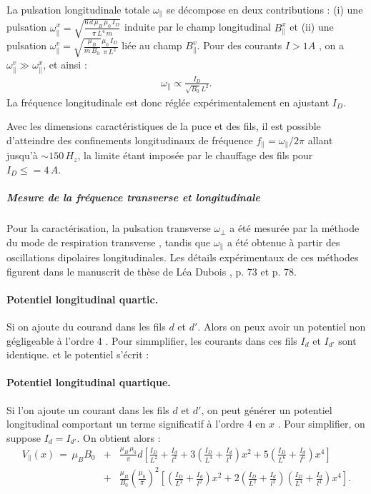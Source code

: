 \medskip

La pulsation longitudinale totale $\omega_\parallel$ se décompose en deux contributions : (i) une pulsation $\omega_\parallel^x = \sqrt{\frac{6\, d \, \mu_B \, \mu_0 \,I_D }{\pi \, L^4 \, m}}$ induite par le champ longitudinal $B_\parallel^x$ et (ii) une pulsation $\omega_\parallel^v = \sqrt{\frac{\mu_B }{m \, B_0}}\frac{\mu_0 \, I_D }{\pi \, L^2}$ liée au champ  $B_\parallel^v$. Pour des courants $I>1A$ , on a $\omega_\parallel^v \gg \omega_\parallel^x$, et ainsi :  
\begin{eqnarray*}
	\omega_\parallel \propto \frac{I_D}{\sqrt{B_0} L^2}.
\end{eqnarray*} 
La fréquence longitudinale est donc réglée expérimentalement en ajustant $I_D$.

\medskip

Avec les dimensions caractéristiques de la puce et des fils, il est possible d’atteindre des confinements longitudinaux de fréquence $f_\parallel = \omega_\parallel/ 2 \pi$ allant jusqu’à $\sim 150 \, H_z$, la limite étant imposée par le chauffage des fils pour $I_D \leq =4 \, A$.
 
 \medskip
 
 \subparagraph{Mesure de la fréquence transverse et longitudinale}
Pour la caractérisation, la pulsation transverse $\omega_\perp$ a été mesurée par la méthode du mode de respiration transverse \cite{Kagan1996}, tandis que $\omega_\parallel$ a été obtenue à partir des oscillations dipolaires longitudinales. Les détails expérimentaux de ces méthodes figurent dans le manuscrit de thèse de Léa Dubois \cite{L.Dubois2024}, p. 73 et p. 78.

\medskip

 \paragraph{Potentiel longitudinal quartic.}
 Si on ajoute du courand  dans les fils $d$ et $d'$.  Alors on peux avoir un potentiel non gégligeable à l'ordre 4 . Pour simmplifier, les courants dans ces fils $I_d$ et $I_{d'}$ sont identique. et le potentiel s'écrit : 
 \paragraph{Potentiel longitudinal quartique.}
Si l’on ajoute un courant dans les fils $d$ et $d'$, on peut générer un potentiel longitudinal comportant un terme significatif à l’ordre 4 en $x$ . Pour simplifier, on suppose $I_d=I_{d'}$. On obtient alors : 
 \begin{eqnarray*}
 	V_\parallel(x) \, = \, \mu_B B_0  & + & 	 \frac{\mu_B \, \mu_0}{\pi} d  \left [ \frac{I_D}{L^2} + \frac{I_d}{l^2} + 3 \left ( \frac{I_D}{L^4} + \frac{I_d}{l^4} \right ) x^2  +  5 \left ( \frac{I_D}{L^6} + \frac{I_d}{l^6} \right ) x^4 \right ] \\
 	& + & \frac{\mu_B}{B_0} \left ( \frac{\mu_0}{\pi} \right )^2  \left [ \left ( \frac{I_D}{L^2} + \frac{I_d}{l^2} \right ) x^2  + 2 \left ( \frac{I_D}{L^2} + \frac{I_d}{l^2} \right )\left ( \frac{I_D}{L^4} + \frac{I_d}{l^4} \right ) x^4 \right ].
 \end{eqnarray*}
 
